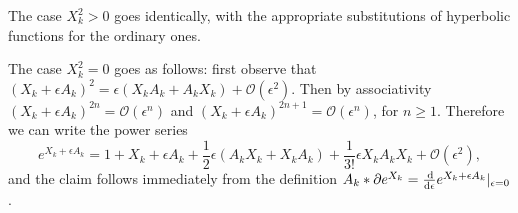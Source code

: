 \documentclass[a4paper,12pt]{article}
\theoremstyle{definition}
\begin{document}
The case $X_k^2 > 0$ goes identically, with the appropriate substitutions of hyperbolic functions for the ordinary ones.

The case $X_k^2 = 0$ goes as follows: first observe that $(X_k + \epsilon A_k)^2 = \epsilon (X_k A_k + A_k X_k) + \mathcal{O}(\epsilon^2)$.
Then by associativity $(X_k + \epsilon A_k)^{2n} = \mathcal{O}(\epsilon^n)$ and $(X_k + \epsilon A_k)^{2n + 1} = \mathcal{O}(\epsilon^n)$, for $n \geq 1$.
Therefore we can write the power series
\begin{equation*}
 e^{X_k + \epsilon A_k} = 1 + X_k + \epsilon A_k + \frac{1}{2} \epsilon (A_k X_k + X_k A_k) + \frac{1}{3!} \epsilon X_k A_k X_k + \mathcal{O}(\epsilon^2),
\end{equation*}
and the claim follows immediately from the definition $A_k * \partial e^{X_k} = \frac{\dif}{\dif \epsilon} e^{X_k + \epsilon A_k} \vert_{\epsilon = 0}$.

\printbibliography[heading=bibintoc, title={References}]
\end{document}
